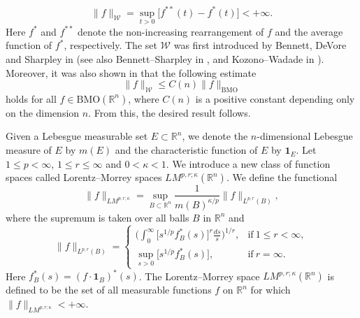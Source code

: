 \documentclass{birkjour}
\theoremstyle{definition}
\theoremstyle{remark}
\numberwithin{equation}{section}
\begin{document}
\begin{equation*}
\|f\|_{\mathcal{W}}=\sup_{t>0}\big[f^{**}(t)-f^{*}(t)\big]<+\infty.
\end{equation*}
Here $f^{*}$ and $f^{**}$ denote the non-increasing rearrangement of $f$ and the average function of $f^{*}$, respectively. The set $\mathcal{W}$ was first introduced by Bennett, DeVore and Sharpley in \cite{be1}(see also Bennett--Sharpley in \cite{be2}, and Kozono--Wadade in \cite{Kozono2}). Moreover, it was also shown in \cite{Kozono2} that the following estimate
\begin{equation*}
\|f\|_{\mathcal{W}}\leq C(n)\|f\|_{\mathrm{BMO}}
\end{equation*}
holds for all $f\in \mathrm{BMO}(\mathbb R^n)$, where $C(n)$ is a positive constant depending only on the dimension $n$. From this, the desired result follows.

Given a Lebesgue measurable set $E\subset\mathbb R^n$, we denote the $n$-dimensional Lebesgue measure of $E$ by $m(E)$ and the
characteristic function of $E$ by $\mathbf{1}_E$. Let $1\leq p<\infty$, $1\leq r\leq\infty$ and $0<\kappa<1$. We introduce a new class of function spaces called Lorentz--Morrey spaces $LM^{p,r;\kappa}(\mathbb R^n)$. We define the functional
\begin{equation*}
\|f\|_{LM^{p,r;\kappa}}=\sup_{B\subset\mathbb R^n}\frac{1}{m(B)^{\kappa/p}}\|f\|_{L^{p,r}(B)},
\end{equation*}
where the supremum is taken over all balls $B$ in $\mathbb R^n$ and
\begin{equation*}
\|f\|_{L^{p,r}(B)}=
\begin{cases}
\displaystyle\bigg(\int_0^{\infty}\Big[s^{1/p}f^{*}_{B}(s)\Big]^r\frac{ds}{s}\bigg)^{1/r}, &\mbox{if}~ 1\leq r<\infty,\\
\displaystyle\sup_{s>0}\Big[s^{1/p}f^{*}_{B}(s)\Big], &\mbox{if}~ r=\infty.
\end{cases}
\end{equation*}
Here $f^{*}_{B}(s)=(f\cdot\mathbf{1}_{B})^{*}(s)$. The Lorentz--Morrey space $LM^{p,r;\kappa}(\mathbb R^n)$ is defined to be the set of all measurable functions $f$ on $\mathbb R^n$ for which $\|f\|_{LM^{p,r;\kappa}}<+\infty$.
\end{document}
